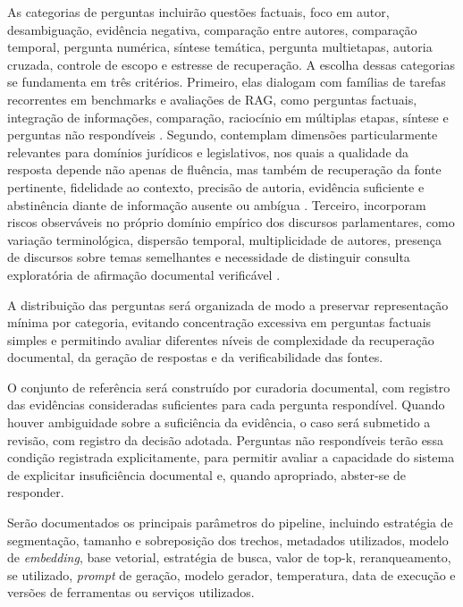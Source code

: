 As categorias de perguntas incluirão questões factuais, foco em autor, desambiguação, evidência negativa, comparação entre autores, comparação temporal, pergunta numérica, síntese temática, pergunta multietapas, autoria cruzada, controle de escopo e estresse de recuperação. A escolha dessas categorias se fundamenta em três critérios. Primeiro, elas dialogam com famílias de tarefas recorrentes em benchmarks e avaliações de RAG, como perguntas factuais, integração de informações, comparação, raciocínio em múltiplas etapas, síntese e perguntas não respondíveis \parencite{zhuEtAl2025rageval,saadFalconEtAl2024ares,esEtAl2023ragas}. Segundo, contemplam dimensões particularmente relevantes para domínios jurídicos e legislativos, nos quais a qualidade da resposta depende não apenas de fluência, mas também de recuperação da fonte pertinente, fidelidade ao contexto, precisão de autoria, evidência suficiente e abstinência diante de informação ausente ou ambígua \parencite{pipitoneAlami2024legalbenchRag,dahlEtAl2024largeLegalFictions}. Terceiro, incorporam riscos observáveis no próprio domínio empírico dos discursos parlamentares, como variação terminológica, dispersão temporal, multiplicidade de autores, presença de discursos sobre temas semelhantes e necessidade de distinguir consulta exploratória de afirmação documental verificável \parencite{blanco2025plenarioPalanqueEstudio,blanco2026letrasGraudas,martelloteViola2025organizacaoConhecimento}.

A distribuição das perguntas será organizada de modo a preservar representação mínima por categoria, evitando concentração excessiva em perguntas factuais simples e permitindo avaliar diferentes níveis de complexidade da recuperação documental, da geração de respostas e da verificabilidade das fontes.

O conjunto de referência será construído por curadoria documental, com registro das evidências consideradas suficientes para cada pergunta respondível. Quando houver ambiguidade sobre a suficiência da evidência, o caso será submetido a revisão, com registro da decisão adotada. Perguntas não respondíveis terão essa condição registrada explicitamente, para permitir avaliar a capacidade do sistema de explicitar insuficiência documental e, quando apropriado, abster-se de responder.

Serão documentados os principais parâmetros do pipeline, incluindo estratégia de segmentação, tamanho e sobreposição dos trechos, metadados utilizados, modelo de \textit{embedding}, base vetorial, estratégia de busca, valor de top-k, reranqueamento, se utilizado, \textit{prompt} de geração, modelo gerador, temperatura, data de execução e versões de ferramentas ou serviços utilizados.

